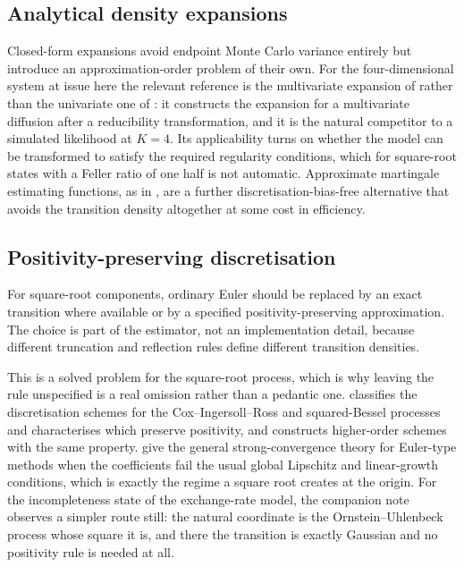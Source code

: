 \documentclass[11pt]{article}
\theoremstyle{definition}
\begin{document}
\subsection{Analytical density expansions}

Closed-form expansions avoid endpoint Monte Carlo variance entirely but introduce an approximation-order problem of their own. For the four-dimensional system at issue here the relevant reference is the multivariate expansion of \citet{AitSahalia2008} rather than the univariate one of \citet{AitSahalia2002}: it constructs the expansion for a multivariate diffusion after a reducibility transformation, and it is the natural competitor to a simulated likelihood at $K=4$. Its applicability turns on whether the model can be transformed to satisfy the required regularity conditions, which for square-root states with a Feller ratio of one half is not automatic. Approximate martingale estimating functions, as in \citet{Kessler1997}, are a further discretisation-bias-free alternative that avoids the transition density altogether at some cost in efficiency.

\subsection{Positivity-preserving discretisation}

For square-root components, ordinary Euler should be replaced by an exact transition where available or by a specified positivity-preserving approximation. The choice is part of the estimator, not an implementation detail, because different truncation and reflection rules define different transition densities.

This is a solved problem for the square-root process, which is why leaving the rule unspecified is a real omission rather than a pedantic one. \citet{Alfonsi2005} classifies the discretisation schemes for the Cox--Ingersoll--Ross and squared-Bessel processes and characterises which preserve positivity, and \citet{Alfonsi2010} constructs higher-order schemes with the same property. \citet{HighamMaoStuart2002} give the general strong-convergence theory for Euler-type methods when the coefficients fail the usual global Lipschitz and linear-growth conditions, which is exactly the regime a square root creates at the origin. For the incompleteness state of the exchange-rate model, the companion note observes a simpler route still: the natural coordinate is the Ornstein--Uhlenbeck process whose square it is, and there the transition is exactly Gaussian and no positivity rule is needed at all.
\end{document}
